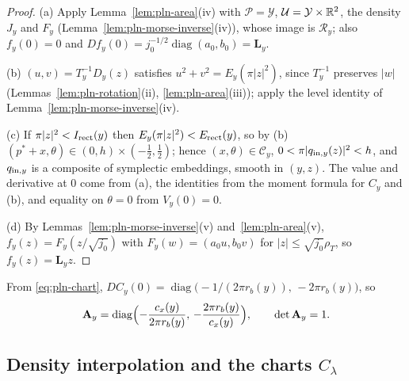 \begin{proof}
(a) Apply Lemma~\ref{lem:pln-area}(iv) with $\mathcal P=\mathcal Y$, $\mathcal U=\mathcal Y\times\mathbb{R}^2$, the density $J_y$ and $F_y$ (Lemma~\ref{lem:pln-morse-inverse}(iv)), whose image is $\mathcal R_y$; also $f_y(0)=0$ and $Df_y(0)=j_0^{-1/2}\operatorname{diag}(a_0,b_0)=\mathbf L_y$.

(b) $(u,v)=T_y^{-1}D_y(z)$ satisfies $u^2+v^2=E_y(\pi|z|^2)$, since $T_y^{-1}$ preserves $|w|$ (Lemmas~\ref{lem:pln-rotation}(ii), \ref{lem:pln-area}(iii)); apply the level identity of Lemma~\ref{lem:pln-morse-inverse}(iv).

(c) If $\pi|z|^2<I_{\rm rect}(y)$ then $E_y(\pi|z|^2)<E_{\rm rect}(y)$, so by (b) $(p^*+x,\theta)\in(0,h)\times(-\frac12,\frac12)$; hence $(x,\theta)\in\mathcal C_y$, $0<\pi|q_{{\rm in},y}(z)|^2<h$, and $q_{{\rm in},y}$ is a composite of symplectic embeddings, smooth in $(y,z)$. The value and derivative at $0$ come from (a), the identities from the moment formula for $C_y$ and (b), and equality on $\theta=0$ from $V_y(0)=0$.

(d) By Lemmas~\ref{lem:pln-morse-inverse}(v) and~\ref{lem:pln-area}(v), $f_y(z)=F_y(z/\sqrt{j_0})$ with $F_y(w)=(a_0u,b_0v)$ for $|z|\le\sqrt{j_0}\rho_T$, so $f_y(z)=\mathbf L_yz$.
\end{proof}

From \eqref{eq:pln-chart}, $DC_y(0)=\operatorname{diag}\bigl(-1/(2\pi r_b(y)),\,-2\pi r_b(y)\bigr)$, so
\begin{equation}\label{eq:pln-A0}
 \mathbf A_y=\operatorname{diag}\Bigl(-\frac{c_x(y)}{2\pi r_b(y)},\,-\frac{2\pi r_b(y)}{c_x(y)}\Bigr),\qquad\det\mathbf A_y=1.
\end{equation}

\subsection{Density interpolation and the charts \texorpdfstring{$C_\lambda$}{C-lambda}}\label{sec:pln-charts}

